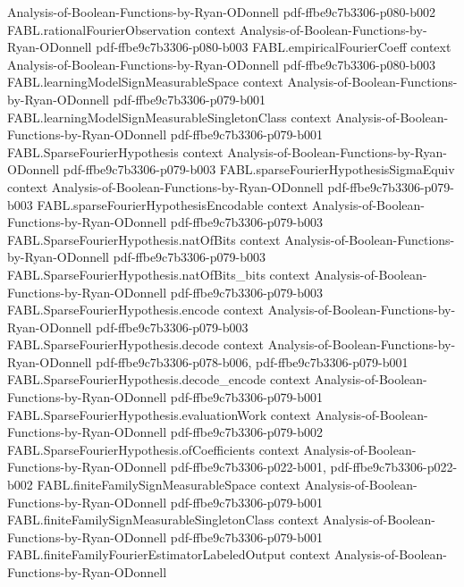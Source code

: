\begin{theorem}
  {Analysis-of-Boolean-Functions-by-Ryan-ODonnell}
  {pdf-ffbe9c7b3306-p080-b002}
\proofstep
  {FABL.rationalFourierObservation}
  {context}
  {Analysis-of-Boolean-Functions-by-Ryan-ODonnell}
  {pdf-ffbe9c7b3306-p080-b003}
\proofstep
  {FABL.empiricalFourierCoeff}
  {context}
  {Analysis-of-Boolean-Functions-by-Ryan-ODonnell}
  {pdf-ffbe9c7b3306-p080-b003}
\proofstep
  {FABL.learningModelSignMeasurableSpace}
  {context}
  {Analysis-of-Boolean-Functions-by-Ryan-ODonnell}
  {pdf-ffbe9c7b3306-p079-b001}
\proofstep
  {FABL.learningModelSignMeasurableSingletonClass}
  {context}
  {Analysis-of-Boolean-Functions-by-Ryan-ODonnell}
  {pdf-ffbe9c7b3306-p079-b001}
\proofstep
  {FABL.SparseFourierHypothesis}
  {context}
  {Analysis-of-Boolean-Functions-by-Ryan-ODonnell}
  {pdf-ffbe9c7b3306-p079-b003}
\proofstep
  {FABL.sparseFourierHypothesisSigmaEquiv}
  {context}
  {Analysis-of-Boolean-Functions-by-Ryan-ODonnell}
  {pdf-ffbe9c7b3306-p079-b003}
\proofstep
  {FABL.sparseFourierHypothesisEncodable}
  {context}
  {Analysis-of-Boolean-Functions-by-Ryan-ODonnell}
  {pdf-ffbe9c7b3306-p079-b003}
\proofstep
  {FABL.SparseFourierHypothesis.natOfBits}
  {context}
  {Analysis-of-Boolean-Functions-by-Ryan-ODonnell}
  {pdf-ffbe9c7b3306-p079-b003}
\proofstep
  {FABL.SparseFourierHypothesis.natOfBits_bits}
  {context}
  {Analysis-of-Boolean-Functions-by-Ryan-ODonnell}
  {pdf-ffbe9c7b3306-p079-b003}
\proofstep
  {FABL.SparseFourierHypothesis.encode}
  {context}
  {Analysis-of-Boolean-Functions-by-Ryan-ODonnell}
  {pdf-ffbe9c7b3306-p079-b003}
\proofstep
  {FABL.SparseFourierHypothesis.decode}
  {context}
  {Analysis-of-Boolean-Functions-by-Ryan-ODonnell}
  {pdf-ffbe9c7b3306-p078-b006,
    pdf-ffbe9c7b3306-p079-b001}
\proofstep
  {FABL.SparseFourierHypothesis.decode_encode}
  {context}
  {Analysis-of-Boolean-Functions-by-Ryan-ODonnell}
  {pdf-ffbe9c7b3306-p079-b001}
\proofstep
  {FABL.SparseFourierHypothesis.evaluationWork}
  {context}
  {Analysis-of-Boolean-Functions-by-Ryan-ODonnell}
  {pdf-ffbe9c7b3306-p079-b002}
\proofstep
  {FABL.SparseFourierHypothesis.ofCoefficients}
  {context}
  {Analysis-of-Boolean-Functions-by-Ryan-ODonnell}
  {pdf-ffbe9c7b3306-p022-b001,
    pdf-ffbe9c7b3306-p022-b002}
\proofstep
  {FABL.finiteFamilySignMeasurableSpace}
  {context}
  {Analysis-of-Boolean-Functions-by-Ryan-ODonnell}
  {pdf-ffbe9c7b3306-p079-b001}
\proofstep
  {FABL.finiteFamilySignMeasurableSingletonClass}
  {context}
  {Analysis-of-Boolean-Functions-by-Ryan-ODonnell}
  {pdf-ffbe9c7b3306-p079-b001}
\proofstep
  {FABL.finiteFamilyFourierEstimatorLabeledOutput}
  {context}
  {Analysis-of-Boolean-Functions-by-Ryan-ODonnell}

\end{theorem}
